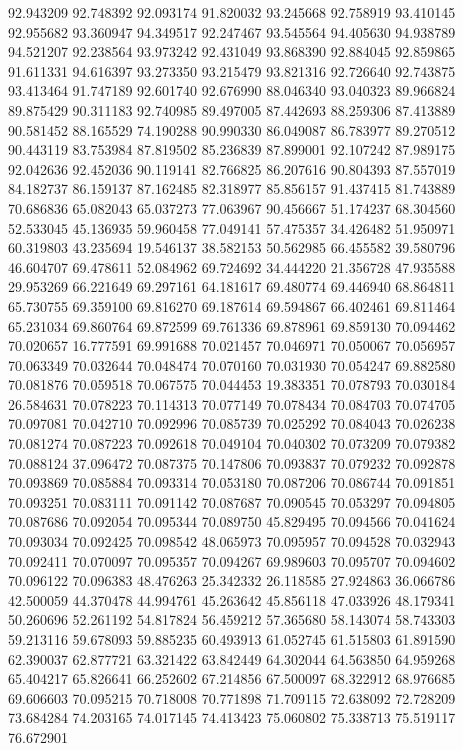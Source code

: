 92.943209
92.748392
92.093174
91.820032
93.245668
92.758919
93.410145
92.955682
93.360947
94.349517
92.247467
93.545564
94.405630
94.938789
94.521207
92.238564
93.973242
92.431049
93.868390
92.884045
92.859865
91.611331
94.616397
93.273350
93.215479
93.821316
92.726640
92.743875
93.413464
91.747189
92.601740
92.676990
88.046340
93.040323
89.966824
89.875429
90.311183
92.740985
89.497005
87.442693
88.259306
87.413889
90.581452
88.165529
74.190288
90.990330
86.049087
86.783977
89.270512
90.443119
83.753984
87.819502
85.236839
87.899001
92.107242
87.989175
92.042636
92.452036
90.119141
82.766825
86.207616
90.804393
87.557019
84.182737
86.159137
87.162485
82.318977
85.856157
91.437415
81.743889
70.686836
65.082043
65.037273
77.063967
90.456667
51.174237
68.304560
52.533045
45.136935
59.960458
77.049141
57.475357
34.426482
51.950971
60.319803
43.235694
19.546137
38.582153
50.562985
66.455582
39.580796
46.604707
69.478611
52.084962
69.724692
34.444220
21.356728
47.935588
29.953269
66.221649
69.297161
64.181617
69.480774
69.446940
68.864811
65.730755
69.359100
69.816270
69.187614
69.594867
66.402461
69.811464
65.231034
69.860764
69.872599
69.761336
69.878961
69.859130
70.094462
70.020657
16.777591
69.991688
70.021457
70.046971
70.050067
70.056957
70.063349
70.032644
70.048474
70.070160
70.031930
70.054247
69.882580
70.081876
70.059518
70.067575
70.044453
19.383351
70.078793
70.030184
26.584631
70.078223
70.114313
70.077149
70.078434
70.084703
70.074705
70.097081
70.042710
70.092996
70.085739
70.025292
70.084043
70.026238
70.081274
70.087223
70.092618
70.049104
70.040302
70.073209
70.079382
70.088124
37.096472
70.087375
70.147806
70.093837
70.079232
70.092878
70.093869
70.085884
70.093314
70.053180
70.087206
70.086744
70.091851
70.093251
70.083111
70.091142
70.087687
70.090545
70.053297
70.094805
70.087686
70.092054
70.095344
70.089750
45.829495
70.094566
70.041624
70.093034
70.092425
70.098542
48.065973
70.095957
70.094528
70.032943
70.092411
70.070097
70.095357
70.094267
69.989603
70.095707
70.094602
70.096122
70.096383
48.476263
25.342332
26.118585
27.924863
36.066786
42.500059
44.370478
44.994761
45.263642
45.856118
47.033926
48.179341
50.260696
52.261192
54.817824
56.459212
57.365680
58.143074
58.743303
59.213116
59.678093
59.885235
60.493913
61.052745
61.515803
61.891590
62.390037
62.877721
63.321422
63.842449
64.302044
64.563850
64.959268
65.404217
65.826641
66.252602
67.214856
67.500097
68.322912
68.976685
69.606603
70.095215
70.718008
70.771898
71.709115
72.638092
72.728209
73.684284
74.203165
74.017145
74.413423
75.060802
75.338713
75.519117
76.672901
